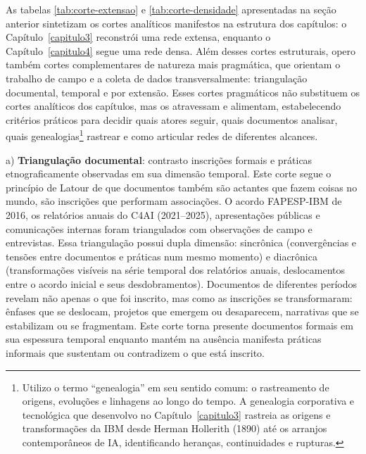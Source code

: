 As tabelas \ref{tab:corte-extensao} e \ref{tab:corte-densidade} apresentadas na seção anterior sintetizam os cortes analíticos manifestos na estrutura dos capítulos: o Capítulo~\ref{capitulo3} reconstrói uma rede extensa, enquanto o Capítulo~\ref{capitulo4} segue uma rede densa. Além desses cortes estruturais, opero também cortes complementares de natureza mais pragmática, que orientam o trabalho de campo e a coleta de dados transversalmente: triangulação documental, temporal e por extensão. Esses cortes pragmáticos não substituem os cortes analíticos dos capítulos, mas os atravessam e alimentam, estabelecendo critérios práticos para decidir quais atores seguir, quais documentos analisar, quais genealogias\footnote{Utilizo o termo ``genealogia'' em seu sentido comum: o rastreamento de origens, evoluções e linhagens ao longo do tempo. A genealogia corporativa e tecnológica que desenvolvo no Capítulo~\ref{capitulo3} rastreia as origens e transformações da IBM desde Herman Hollerith (1890) até os arranjos contemporâneos de IA, identificando heranças, continuidades e rupturas.} rastrear e como articular redes de diferentes alcances.

a) \textbf{Triangulação documental}: contrasto inscrições formais e práticas etnograficamente observadas em sua dimensão temporal. Este corte segue o princípio de Latour de que documentos também são actantes que fazem coisas no mundo, são inscrições que performam associações. O acordo FAPESP-IBM de 2016, os relatórios anuais do C4AI (2021--2025), apresentações públicas e comunicações internas foram triangulados com observações de campo e entrevistas. Essa triangulação possui dupla dimensão: sincrônica (convergências e tensões entre documentos e práticas num mesmo momento) e diacrônica (transformações visíveis na série temporal dos relatórios anuais, deslocamentos entre o acordo inicial e seus desdobramentos). Documentos de diferentes períodos revelam não apenas o que foi inscrito, mas como as inscrições se transformaram: ênfases que se deslocam, projetos que emergem ou desaparecem, narrativas que se estabilizam ou se fragmentam. Este corte torna presente documentos formais em sua espessura temporal enquanto mantém na ausência manifesta práticas informais que sustentam ou contradizem o que está inscrito.

